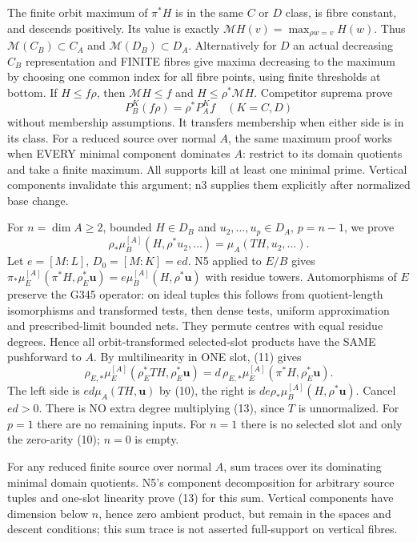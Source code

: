 The finite orbit maximum of $\pi^*H$ is in the same $C$ or $D$ class, is fibre constant, and descends positively. Its value is exactly $\mathcal MH(v)=\max_{\rho w=v}H(w)$. Thus $\mathcal M(C_B)\subset C_A$ and $\mathcal M(D_B)\subset D_A$. Alternatively for $D$ an actual decreasing $C_B$ representation and FINITE fibres give maxima decreasing to the maximum by choosing one common index for all fibre points, using finite thresholds at bottom. If $H\le f\rho$, then $\mathcal MH\le f$ and $H\le\rho^*\mathcal MH$. Competitor suprema prove
\[
 P_B^K(f\rho)=\rho^*P_A^Kf\quad(K=C,D) \tag{12}
\]
without membership assumptions. It transfers membership when either side is in its class. For a reduced source over normal $A$, the same maximum proof works when EVERY minimal component dominates $A$: restrict to its domain quotients and take a finite maximum. All supports kill at least one minimal prime. Vertical components invalidate this argument; n3 supplies them explicitly after normalized base change.

For $n=\dim A\ge2$, bounded $H\in D_B$ and $u_2,\ldots,u_p\in D_A$, $p=n-1$, we prove
\[
 \rho_*\mu_B^{[A]}(H,\rho^*u_2,\ldots)=\mu_A(TH,u_2,\ldots). \tag{13}
\]
Let $e=[M:L]$, $D_0=[M:K]=ed$. N5 applied to $E/B$ gives
$\pi_*\mu_E^{[A]}(\pi^*H,\rho_E^*\boldsymbol u)=e\mu_B^{[A]}(H,\rho^*\boldsymbol u)$ with residue towers. Automorphisms of $E$ preserve the G345 operator: on ideal tuples this follows from quotient-length isomorphisms and transformed tests, then dense tests, uniform approximation and prescribed-limit bounded nets. They permute centres with equal residue degrees. Hence all orbit-transformed selected-slot products have the SAME pushforward to $A$. By multilinearity in ONE slot, (11) gives
\[
 \rho_{E,*}\mu_E^{[A]}(\rho_E^*TH,\rho_E^*\boldsymbol u)
 =d\,\rho_{E,*}\mu_E^{[A]}(\pi^*H,\rho_E^*\boldsymbol u).
\]
The left side is $ed\mu_A(TH,\boldsymbol u)$ by (10), the right is $de\rho_*\mu_B^{[A]}(H,\rho^*\boldsymbol u)$. Cancel $ed>0$. There is NO extra degree multiplying (13), since $T$ is unnormalized. For $p=1$ there are no remaining inputs. For $n=1$ there is no selected slot and only the zero-arity (10); $n=0$ is empty.

For any reduced finite source over normal $A$, sum traces over its dominating minimal domain quotients. N5's component decomposition for arbitrary source tuples and one-slot linearity prove (13) for this sum. Vertical components have dimension below $n$, hence zero ambient product, but remain in the spaces and descent conditions; this sum trace is not asserted full-support on vertical fibres.

